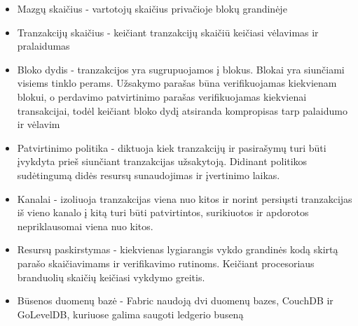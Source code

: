 \documentclass{VUMIFPSkursinis}
\begin{document}
			\begin{itemize}
				\item{Mazgų skaičius - vartotojų skaičius privačioje blokų grandinėje}
				\item{Tranzakcijų skaičius - keičiant tranzakcijų skaičiū keičiasi vėlavimas ir pralaidumas}
				\item{Bloko dydis - tranzakcijos yra sugrupuojamos į blokus. Blokai yra siunčiami visiems tinklo perams. Užsakymo parašas 
būna verifikuojamas kiekvienam blokui, o perdavimo patvirtinimo parašas verifikuojamas kiekvienai transakcijai, todėl keičiant bloko dydį atsiranda kompropisas tarp palaidumo ir vėlavim}
				\item{Patvirtinimo politika - diktuoja kiek tranzakcijų ir pasirašymų turi būti įvykdyta prieš siunčiant tranzakcijas užsakytoją. Didinant politikos sudėtingumą didės resursų sunaudojimas ir įvertinimo laikas.}
				\item{Kanalai - izoliuoja tranzakcijas viena nuo kitos ir norint persiųsti tranzakcijas iš vieno kanalo į kitą turi būti patvirtintos, surikiuotos ir apdorotos nepriklausomai viena nuo kitos.}
				\item{Resursų paskirstymas - kiekvienas lygiarangis vykdo grandinės kodą skirtą parašo skaičiavimams ir verifikavimo rutinoms. Keičiant procesoriaus branduolių skaičių keičiasi vykdymo greitis.}
				\item{Būsenos duomenų bazė - Fabric naudoją dvi duomenų bazes, CouchDB ir GoLevelDB, kuriuose galima saugoti ledgerio buseną}
			\end{itemize}
\end{document}
